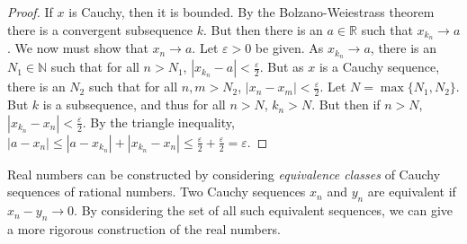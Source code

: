 \documentclass[crop=false,class=book,oneside]{standalone}
\begin{document}
            \begin{proof}
                If $x$ is Cauchy, then it is bounded.
                By the Bolzano-Weiestrass theorem there
                is a convergent subsequence $k$. But then there
                is an $a\in\mathbb{R}$ such that
                $x_{k_{n}}\rightarrow{a}$. We now must show that
                $x_{n}\rightarrow{a}$. Let $\varepsilon>0$
                be given. As $x_{k_{n}}\rightarrow{a}$,
                there is an $N_{1}\in\mathbb{N}$ such
                that for all $n>N_{1}$,
                $|x_{k_{n}}-a|<\frac{\varepsilon}{2}$.
                But as $x$ is a Cauchy sequence, there
                is an $N_{2}$ such that for all $n,m>N_{2}$, 
                $|x_{n}-x_{m}|<\frac{\varepsilon}{2}$. Let
                $N=\max\{N_{1},N_{2}\}$. 
                But $k$ is a subsequence, and thus for all
                $n>N$, $k_{n}>N$. But then if $n>N$,
                $|x_{k_{n}}-x_{n}|<\frac{\varepsilon}{2}$.
                By the triangle inequality,
                    $|a-x_{n}|\leq
                     |a-x_{k_{n}}|+|x_{k_{n}}-x_{n}|\leq
                     \frac{\varepsilon}{2}+
                     \frac{\varepsilon}{2}%
                     =\varepsilon$.
            \end{proof}
            Real numbers can be constructed by considering
            \textit{equivalence classes} of Cauchy sequences of
            rational numbers. Two Cauchy sequences $x_{n}$ and
            $y_{n}$ are equivalent if $x_{n}-y_{n}\rightarrow{0}$.
            By considering the set
            of all such equivalent sequences, we can give a more
            rigorous construction of the real numbers.
\end{document}

